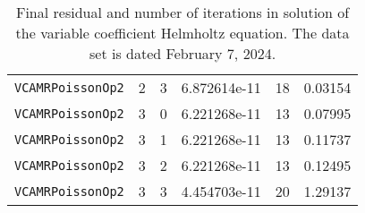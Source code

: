 \documentclass{article}
\begin{document}
\begin{small}
\begin{table}
\begin{center}
\begin{tabular}{|c|c|c|c|c||c|}
 {\tt VCAMRPoissonOp2}            & 2   & 3    & 6.872614e-11   & 18   & 0.03154\\
 {\tt VCAMRPoissonOp2}            & 3   & 0    & 6.221268e-11   & 13   & 0.07995\\
 {\tt VCAMRPoissonOp2}            & 3   & 1    & 6.221268e-11   & 13   & 0.11737\\
 {\tt VCAMRPoissonOp2}            & 3   & 2    & 6.221268e-11   & 13   & 0.12495\\
 {\tt VCAMRPoissonOp2}            & 3   & 3    & 4.454703e-11   & 20   & 1.29137\\
\hline
\end{tabular}
\end{center}
\label{tab::conductivity}
\caption
    {
      Final residual and number of iterations in solution of the variable
      coefficient Helmholtz equation.
      The data set is dated February 7, 2024.
    }
\end{table}
\end{small}
\end{document}
